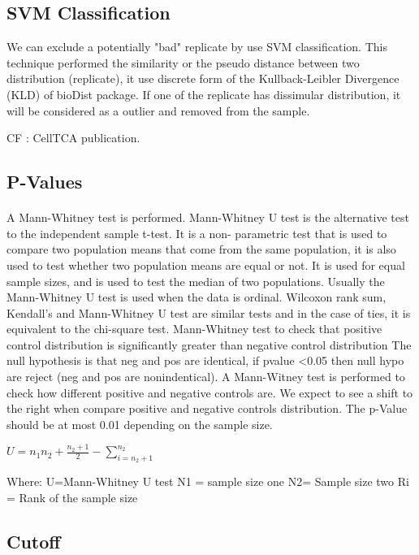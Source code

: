 \documentclass[a4paper,10pt]{article}
\begin{document}
\subsection*{SVM Classification}


We can exclude a potentially "bad" replicate by use SVM classification. This technique performed the similarity or the pseudo distance
between two distribution (replicate), it use discrete form of the Kullback-Leibler Divergence (KLD) of bioDist package.
If one of the replicate has dissimular distribution, it will be considered as a outlier and removed from the sample.

CF : CellTCA publication.


\subsection*{P-Values}
\paragraph*{}


A Mann-Whitney test is performed. Mann-Whitney U test is the alternative test to the independent sample t-test.  It is a non-
parametric test that is used to compare two population means that come from the same population, it is also used to test whether 
two population means are equal or not.  It is used for equal sample sizes, and is used to test the median of two populations. 
Usually the Mann-Whitney U test is used when the data is ordinal. Wilcoxon rank sum, Kendall’s and Mann-Whitney U test are 
similar tests and in the case of ties, it is equivalent to the chi-square test.
Mann-Whitney test to check that positive control distribution is significantly greater than negative control distribution
The null hypothesis is that neg and pos are identical, if pvalue \textless 0.05 then null hypo are reject (neg and pos are nonindentical).
A Mann-Witney test is performed to check how different positive and negative 
controls are. We expect to see a shift to the right when compare positive and negative 
controls distribution. The p-Value should be at most 0.01 depending on the sample size.


\begin{center}
$U=n_{1}n_{2}+\frac{n_{2}+1}{2}-\sum_{i=n_{2}+1}^{n_{2}}$
\end{center}
Where:
U=Mann-Whitney U test
N1 = sample size one
N2= Sample size two
Ri = Rank of the sample size


\subsection*{Cutoff}
\end{document}
